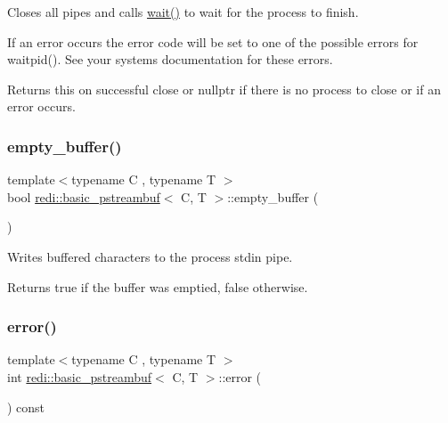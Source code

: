 Closes all pipes and calls \mbox{\hyperlink{classredi_1_1basic__pstreambuf_afa976526cfb7ea56e29afbee8ead68e1}{wait()}} to wait for the process to finish.

If an error occurs the error code will be set to one of the possible errors for {\ttfamily waitpid()}. See your system\textquotesingle{}s documentation for these errors.

\begin{DoxyReturn}{Returns}
{\ttfamily this} on successful close or {\ttfamily nullptr} if there is no process to close or if an error occurs. 
\end{DoxyReturn}
\mbox{\label{classredi_1_1basic__pstreambuf_aa9d2bb07c6d563cbf9886d69fa42523e}} 
\subsubsection{\texorpdfstring{empty\+\_\+buffer()}{empty\_buffer()}}
{\footnotesize\ttfamily template$<$typename C , typename T $>$ \\
bool \mbox{\hyperlink{classredi_1_1basic__pstreambuf}{redi\+::basic\+\_\+pstreambuf}}$<$ C, T $>$\+::empty\+\_\+buffer (\begin{DoxyParamCaption}{ }\end{DoxyParamCaption})\hspace{0.3cm}{\ttfamily [protected]}}



Writes buffered characters to the process\textquotesingle{} stdin pipe. 

\begin{DoxyReturn}{Returns}
true if the buffer was emptied, false otherwise. 
\end{DoxyReturn}
\mbox{\label{classredi_1_1basic__pstreambuf_a87e5bc3b59a7cb3f72fd81ebde783c13}} 
\subsubsection{\texorpdfstring{error()}{error()}}
{\footnotesize\ttfamily template$<$typename C , typename T $>$ \\
int \mbox{\hyperlink{classredi_1_1basic__pstreambuf}{redi\+::basic\+\_\+pstreambuf}}$<$ C, T $>$\+::error (\begin{DoxyParamCaption}{ }\end{DoxyParamCaption}) const\hspace{0.3cm}{\ttfamily [inline]}}



